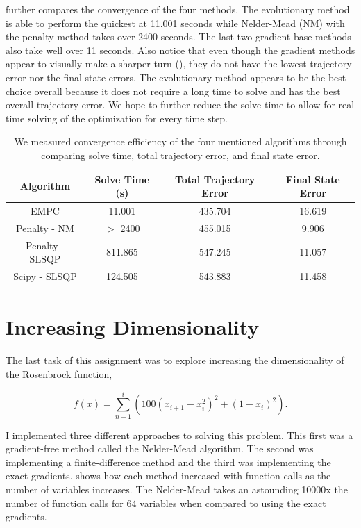 \documentclass{article}
\begin{document}
 further compares the convergence of the four methods. The evolutionary method is able to perform the quickest at 11.001 seconds while Nelder-Mead (NM) with the penalty method takes over 2400 seconds. The last two gradient-base methods also take well over 11 seconds. Also notice that even though the gradient methods appear to visually make a sharper turn (), they do not have the lowest trajectory error nor the final state errors. The evolutionary method appears to be the best choice overall because it does not require a long time to solve and has the best overall trajectory error. We hope to further reduce the solve time to allow for real time solving of the optimization for every time step.

 
\begin{table}[htb]
	\centering
	\caption{We measured convergence efficiency of the four mentioned algorithms through comparing solve time, total trajectory error, and final state error.}
	\label{tab:comp_der}
	\begin{tabular}{c|c|c|c}
		\toprule
		Algorithm & Solve Time (s) & Total Trajectory Error & Final State Error\\
		\midrule
		EMPC & 11.001 & 435.704 & 16.619 \\
		Penalty - NM & $>$ 2400 & 455.015 & 9.906 \\
		Penalty - SLSQP & 811.865 &  547.245 & 11.057 \\
		Scipy - SLSQP  & 124.505 & 543.883 & 11.458 \\
		\bottomrule
	\end{tabular}
\end{table}



\section*{Increasing Dimensionality}

The last task of this assignment was to explore increasing the dimensionality of the Rosenbrock function,

$$ f(x) = \sum_{n-1}^{i} (100(x_{i+1}-x_i^2)^2+(1-x_i)^2). $$ 

I implemented three different approaches to solving this problem. This first was a gradient-free method called the Nelder-Mead algorithm. The second was implementing a finite-difference method and the third was implementing the exact gradients.  shows how each method increased with function calls as the number of variables increases. The Nelder-Mead takes an astounding 10000x the number of function calls for 64 variables when compared to using the exact gradients. 
\end{document}
